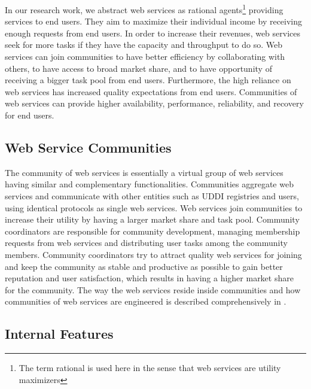 \documentclass[10pt,journal,cspaper,compsoc]{IEEEtran}
\begin{document}
In our research work, we abstract web services as rational agents\footnote{The term rational is used here in the sense that web services are utility maximizers} providing services to end users. They aim to maximize their individual income  by receiving enough requests from end users. In order to increase their revenues, web services seek for more tasks if they have the capacity and throughput to do so. Web services can join communities to have better efficiency by collaborating with others, to have access to broad market share, and to have opportunity of receiving a bigger task pool from end users. Furthermore, the high reliance on web services has increased quality expectations from end users. Communities of web services can provide higher availability, performance, reliability, and recovery for end users.

\subsection{Web Service Communities}\label{s:wsc}

The community of web services is essentially a virtual group of web services having similar and complementary functionalities. Communities aggregate web services and communicate with other entities such as UDDI registries and users, using identical protocols as single web services. Web services join communities to increase their utility by having a larger market share and task pool. Community coordinators are responsible for community development, managing membership requests from web services and distributing user tasks among the community members. Community coordinators try to attract quality web services for joining and keep the community as stable and productive as possible to gain better reputation and user satisfaction, which results in having a higher market share for the community. The way the web services reside inside communities and how communities of web services are engineered is described comprehensively in \cite{DBLP:journals/ijebr/MaamarSTBB09}.


\subsection{Internal Features}\label{s:if}
\end{document}
